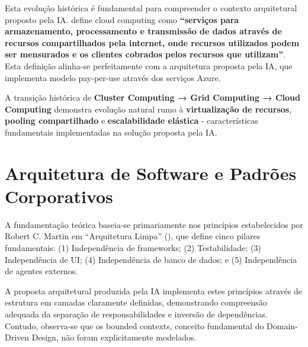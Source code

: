 Esta evolução histórica é fundamental para compreender o contexto arquitetural proposto pela IA.  define cloud computing como \textbf{``serviços para armazenamento, processamento e transmissão de dados através de recursos compartilhados pela internet, onde recursos utilizados podem ser mensurados e os clientes cobrados pelos recursos que utilizam''}. Esta definição alinha-se perfeitamente com a arquitetura proposta pela IA, que implementa modelo pay-per-use através dos serviços Azure.

A transição histórica de \textbf{Cluster Computing → Grid Computing → Cloud Computing}  demonstra evolução natural rumo à \textbf{virtualização de recursos}, \textbf{pooling compartilhado} e \textbf{escalabilidade elástica} - características fundamentais implementadas na solução proposta pela IA.

\section{Arquitetura de Software e Padrões Corporativos}

A fundamentação teórica baseia-se primariamente nos princípios estabelecidos por Robert C. Martin em ``Arquitetura Limpa'' (), que define cinco pilares fundamentais: (1) Independência de frameworks; (2) Testabilidade; (3) Independência de UI; (4) Independência de banco de dados; e (5) Independência de agentes externos.

A proposta arquitetural produzida pela IA implementa estes princípios através de estrutura em camadas claramente definidas, demonstrando compreensão adequada da separação de responsabilidades e inversão de dependências. Contudo, observa-se que os bounded contexts, conceito fundamental do Domain-Driven Design, não foram explicitamente modelados.

